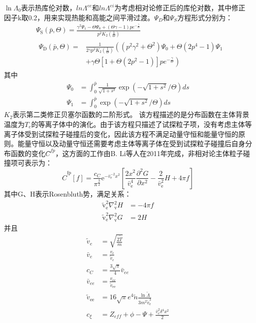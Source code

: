 $\ln \Lambda_0$表示热库伦对数\cite{RN1166}，$lnΛ^{ee}$和$lnΛ^{ei}$为考虑相对论修正后的库伦对数，其中修正因子k取0.2，用来实现热能和高能之间平滑过渡\cite{RN1818}。$Ψ_D$和$Ψ_S$方程形式分别为：
\begin{subequations}
\begin{align}
&\Psi_{\mathrm{S}}(\bar{p}, \Theta)=\frac{\gamma^{2} \Psi_{1}-\Theta \Psi_{0}+(\Theta \gamma-1) p e^{-\frac{\gamma}{\Theta}}}{p^{2} K_{2}\left(\frac{1}{\Theta}\right)} \\
&\begin{aligned} 
\Psi_{\mathrm{D}}(\bar{p}, \Theta)= & \frac{1}{2 \gamma p^{3} K_{2}\left(\frac{1}{\Theta}\right)}\left(\left(p^{2} \gamma^{2}+\Theta^{2}\right) \Psi_{0}+\Theta\left(2 p^{4}-1\right) \Psi_{1}\right. \\ 
 &\left.+\gamma \Theta\left[1+\Theta\left(2 p^{2}-1\right)\right] p e^{-\frac{\gamma}{\Theta}}\right)
\end{aligned}
\end{align}
\end{subequations}
其中
\begin{align}
\Psi_{0}&=\int_{0}^{\bar{p}} \frac{1}{\sqrt{1+s^{2}}} \exp \left(-\sqrt{1+s^{2}} / \Theta\right) d s \\
\Psi_{1}&=\int_{0}^{\bar{p}} \exp \left(-\sqrt{1+s^{2}} / \Theta\right) d s
\end{align}
$K_2$表示第二类修正贝塞尔函数的二阶形式。
该方程描述的是分布函数在主体背景温度为$T_e$的等离子体中的演化。由于该方程只描述了试探粒子项，没有考虑主体等离子体受到试探粒子碰撞后的变化，因此该方程不满足动量守恒和能量守恒的原则。能量守恒以及动量守恒还需要考虑主体等离子体在受到试探粒子碰撞后自身分布函数的变化$C ̂^{fp}$，这方面的工作由B. Li等人在2011年完成\cite{RN1935}，非相对论主体粒子碰撞项可表示为\cite{RN1809}：
\begin{equation}
\hat{C}^{\mathrm{fp}}[f]=\frac{c_{C}}{\pi^{\frac{3}{2}}} \mathrm{e}^{-\bar{v}_{\mathrm{e}}^{-2} x^{2}}\left[\frac{2 x^{2}}{\bar{v}_{\mathrm{e}}^{4}} \frac{\partial^{2} G}{\partial x^{2}}-\frac{2}{\bar{v}_{\mathrm{e}}^{2}} H+4 \pi f\right]
\end{equation}
其中G、H表示Rosenbluth势，满足关系：
\begin{align}
\tilde{\mathrm{v}}_{\mathrm{e}}^{2} \nabla_{\mathrm{v}}^{2} H &=-4 \pi f  \\
 \tilde{\mathrm{v}}_{\mathrm{e}}^{2} \nabla_{\mathrm{v}}^{2} G &=2 H
\end{align}
并且
\begin{equation*}
\begin{aligned}
\widetilde{v}_{e}&=\sqrt{\frac{2 \tilde{T}}{m}}\\
\bar{v}_{e}&=\frac{v_{e}}{\widetilde{v}_{e}}\\
 c_{C}&=\frac{3 \sqrt{\pi}}{4} \bar{v}_{e e}\\
 \bar{v}_{e e}&=\frac{v_{e e}}{\widetilde{v}_{\mathrm{ee}}}\\
\tilde{v}_{\mathrm{ee}}&=16 \sqrt{\pi} e^{4} \tilde{n} \frac{\ln \widetilde{\Lambda}}{3 m^{2} \tilde{v}_{\mathrm{e}}^{3}}\\
 c_{\xi}&=Z_{e f f}+\phi-\Psi+\frac{\bar{v}_{e}^{2} \delta^{4} x^{2}}{2}
\end{aligned}
\end{equation*}

